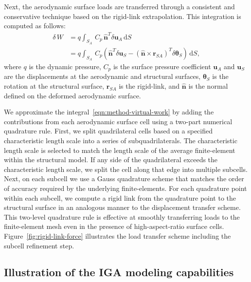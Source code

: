 \documentclass[12pt,headinclude,headsepline]{article}
\newcommand{\mb}{\mathbf}
\newcommand{\mbs}{\boldsymbol}
\begin{document}
Next, the aerodynamic surface loads are transferred through a
consistent and conservative technique based on the rigid-link
extrapolation. This integration is computed as follows:
\begin{equation}
  \begin{aligned}
    \delta\, W & = q \int_{S_{A}} \, C_{p} \, \hat{\mb{n}}^{T} \delta\mb{u}_{A} \, \mathrm{d}S \\
    & = q\int_{S_{A}} \, C_{p} \left( \hat{\mb{n}}^{T} \delta \mathbf{u}_{S} -
    \left( \hat{\mb{n}}\times \mb{r}_{SA} \right)^{T} \delta \mbs{\theta}_{S} \right) \, \mathrm{d}S,
  \end{aligned}
  \label{eqn:method-virtual-work}
\end{equation}
where $q$ is the dynamic pressure, $C_{p}$ is the surface pressure
coefficient $\mb{u}_{A}$ and $\mb{u}_{S}$ are the displacements at the
aerodynamic and structural surfaces, $\mbs{\theta}_{S}$ is the
rotation at the structural surface, $\mb{r}_{SA}$ is the rigid-link,
and $\hat{\mb{n}}$ is the normal defined on the deformed aerodynamic
surface.

We approximate the integral~\eqref{eqn:method-virtual-work} by adding the
contributions from each aerodynamic surface cell using a two-part
numerical quadrature rule. First, we split quadrilateral cells based
on a specified characteristic length scale into a series of
subquadrilaterals. The characteristic length scale is selected to
match the length scale of the average finite-element within the
structural model. If any side of the quadrilateral exceeds the
characteristic length scale, we split the cell along that edge into
multiple subcells. Next, on each subcell we use a Gauss quadrature
scheme that matches the order of accuracy required by the underlying
finite-elements. For each quadrature point within each subcell, we
compute a rigid link from the quadrature point to the structural
surface in an analogous manner to the displacement transfer
scheme. This two-level quadrature rule is effective at smoothly
transferring loads to the finite-element mesh even in the presence of
high-aspect-ratio surface cells. Figure~\ref{fig:rigid-link-force}
illustrates the load transfer scheme including the subcell refinement
step.

\subsection{Illustration of the IGA modeling capabilities}



\end{document}
